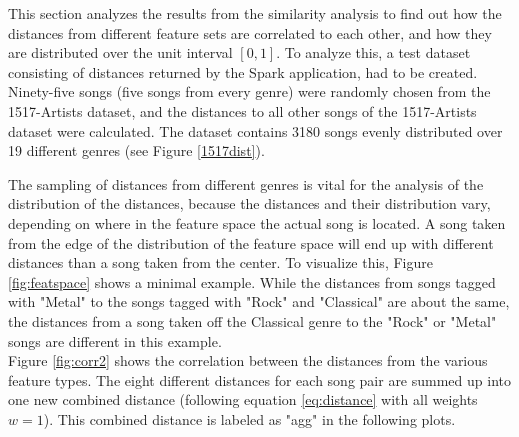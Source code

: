 This section analyzes the results from the similarity analysis to find out how the distances from different feature sets are correlated to each other, and how they are distributed over the unit interval $[0,1]$.
\noindent To analyze this, a test dataset consisting of distances returned by the Spark application, had to be created. Ninety-five songs (five songs from every genre) were randomly chosen from the 1517-Artists dataset, and the distances to all other songs of the 1517-Artists dataset were calculated. The dataset contains 3180 songs evenly distributed over 19 different genres (see Figure \ref{1517dist}).
\begin{figure}[htbp]
	\centering
\end{figure}%
\FloatBarrier

\noindent The sampling of distances from different genres is vital for the analysis of the distribution of the distances, because the distances and their distribution vary, depending on where in the feature space the actual song is located. 
\noindent A song taken from the edge of the distribution of the feature space will end up with different distances than a song taken from the center. To visualize this, Figure \ref{fig:featspace} shows a minimal example. While the distances from songs tagged with "Metal" to the songs tagged with "Rock" and "Classical" are about the same, the distances from a song taken off the Classical genre to the "Rock" or "Metal" songs are different in this example.\\ 
\noindent Figure \ref{fig:corr2} shows the correlation between the distances from the various feature types. The eight different distances for each song pair are summed up into one new combined distance (following equation \eqref{eq:distance} with all weights $w = 1$). This combined distance is labeled as "agg" in the following plots.


